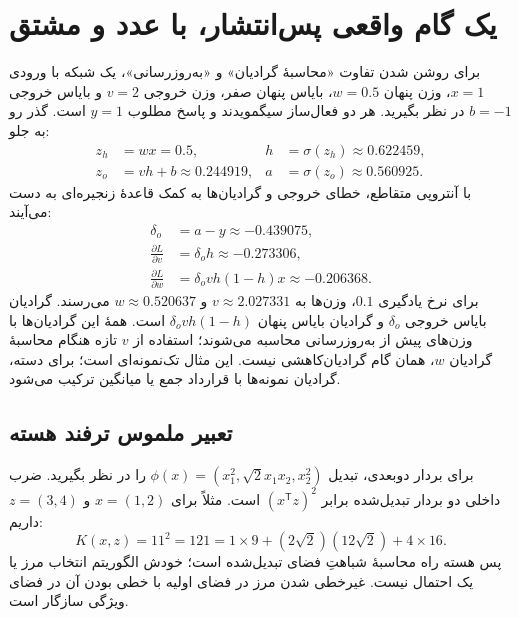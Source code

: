 \section{یک گام واقعی پس‌انتشار، با عدد و مشتق}
برای روشن شدن تفاوت «محاسبهٔ گرادیان» و «به‌روزرسانی»، یک شبکه با ورودی $x=1$، وزن پنهان $w=0.5$، بایاس پنهان صفر، وزن خروجی $v=2$ و بایاس خروجی $b=-1$ در نظر بگیرید. هر دو فعال‌ساز سیگمویدند و پاسخ مطلوب $y=1$ است. گذر رو به جلو:
\begin{align*}
z_h&=wx=0.5,& h&=\sigma(z_h)\approx0.622459,\\
z_o&=vh+b\approx0.244919,& a&=\sigma(z_o)\approx0.560925.
\end{align*}
با آنتروپی متقاطع، خطای خروجی و گرادیان‌ها به کمک قاعدهٔ زنجیره‌ای به دست می‌آیند:
\begin{align*}
\delta_o&=a-y\approx-0.439075,\\
\frac{\partial L}{\partial v}&=\delta_o h\approx-0.273306,\\
\frac{\partial L}{\partial w}&=\delta_o v h(1-h)x\approx-0.206368.
\end{align*}
برای نرخ یادگیری $0.1$، وزن‌ها به $v\approx2.027331$ و $w\approx0.520637$ می‌رسند. گرادیان بایاس خروجی $\delta_o$ و گرادیان بایاس پنهان $\delta_o v h(1-h)$ است. همهٔ این گرادیان‌ها با وزن‌های پیش از به‌روزرسانی محاسبه می‌شوند؛ استفاده از $v$ تازه هنگام محاسبهٔ گرادیان $w$، همان گام گرادیان‌کاهشی نیست. این مثال تک‌نمونه‌ای است؛ برای دسته، گرادیان نمونه‌ها با قرارداد جمع یا میانگین ترکیب می‌شود.

\subsection*{تعبیر ملموس ترفند هسته}
برای بردار دوبعدی، تبدیل $\phi(x)=(x_1^2,\sqrt2x_1x_2,x_2^2)$ را در نظر بگیرید. ضرب داخلی دو بردار تبدیل‌شده برابر $(x^\mathsf Tz)^2$ است. مثلاً برای $x=(1,2)$ و $z=(3,4)$ داریم:
\[K(x,z)=11^2=121=1\times9+(2\sqrt2)(12\sqrt2)+4\times16.\]
پس هسته راه محاسبهٔ شباهتِ فضای تبدیل‌شده است؛ خودش الگوریتم انتخاب مرز یا یک احتمال نیست. غیرخطی شدن مرز در فضای اولیه با خطی بودن آن در فضای ویژگی سازگار است.

